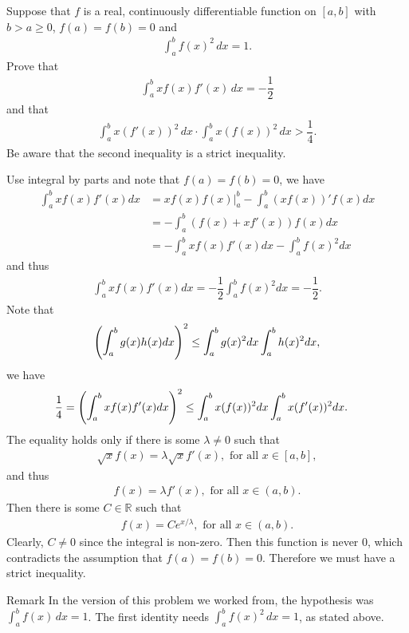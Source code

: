 \begin{problem}
Suppose that $f$ is a real, continuously differentiable function on $[a,b]$ with $b > a \ge 0$, $f(a) = f(b) = 0$ and 
\begin{align*}
    \int_a^b f(x)^2 \,dx = 1.
\end{align*}
Prove that 
\begin{align*}
    \int_a^b x f(x) f'(x) \,dx = -\dfrac{1}{2}
\end{align*}
and that 
\begin{align*}
    \int_a^b x (f'(x))^2 \,dx \cdot \int_a^b x (f(x))^2 \,dx > \dfrac{1}{4}.
\end{align*}
Be aware that the second inequality is a strict inequality.
\begin{solution}
Use integral by parts and note that $f(a)=f(b)=0$, we have
\begin{align*}
    \int_a^bxf(x)f'(x)dx&=xf(x)f(x)|_a^b-\int_a^b(xf(x))'f(x)dx\\
    &=-\int_a^b(f(x)+xf'(x))f(x)dx\\
    &=-\int_a^bxf(x)f'(x)dx -\int_a^bf(x)^2dx 
\end{align*} and thus 
\begin{align*}
    \int_a^bxf(x)f'(x)dx=-\dfrac{1}{2} \int_a^bf(x)^2dx=-\dfrac{1}{2}.
\end{align*}
Note that 
\begin{align*}
    \left( \int_a^b g(x)h(x)dx\right)^2\le \int_a^b g(x)^2dx\int_a^bh(x)^2dx,
\end{align*}
we have 
\begin{align*}
    \dfrac{1}{4}&=\left( \int_a^b xf(x)f'(x)dx\right)^2\le \int_a^b x(f(x))^2dx \int_a^b x(f'(x))^2dx.
\end{align*}
The equality holds only if there is some $\lambda\ne 0$ such that 
\begin{align*}
    \sqrt{x} f(x)=\lambda\sqrt{x}f'(x),\text{ for all }x\in [a,b],
\end{align*}
and thus 
\begin{align*}
    f(x)=\lambda f'(x),\text{ for all }x\in (a,b).
\end{align*}
Then there is some $C\in\mathbb{R}$ such that 
\begin{align*}
    f(x)=Ce^{x/\lambda},\text{ for all }x\in (a,b).
\end{align*}
Clearly, $C \neq 0$ since the integral is non-zero. Then this function is never 0, which contradicts the assumption that $f(a) = f(b) = 0$. Therefore we must have a strict inequality.
\end{solution}
\end{problem}
\begin{rmkbox}{Remark}
In the version of this problem we worked from, the hypothesis was $\int_a^b f(x)\,dx = 1$. The first identity needs $\int_a^b f(x)^2\,dx = 1$, as stated above.
\end{rmkbox}
